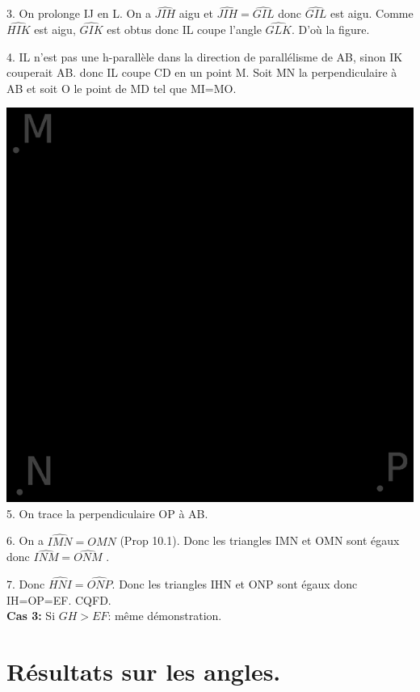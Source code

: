 \documentclass[a4paper, 12pt, twoside]{book}
\begin{document}
  3. On prolonge IJ en L. On a $\hat{JIH}$ aigu et $\hat{JIH}=\hat{GIL}$ donc $\hat{GIL}$ est aigu. Comme $\hat{HIK}$ est aigu, $\hat{GIK}$ est obtus donc IL coupe l'angle $\hat{GLK}$. D'où la figure. \
  
  4. IL n'est pas une h-parallèle dans la direction de parallélisme de AB, sinon IK couperait AB. donc IL coupe CD en un point M. Soit MN la perpendiculaire à AB et soit O le point de MD tel que MI=MO. \
  
   \includegraphics[scale=0.2]{figures/Lobat11.eps}\\
   
   5. On trace la perpendiculaire OP à AB.\
   
   6. On a $\hat{IMN}=\hat{OMN}$ (Prop 10.1). Donc les triangles IMN et OMN sont égaux donc $\hat{INM}=\hat{ONM}$ .\
   
   7. Donc $\hat{HNI}=\hat{ONP}$. Donc les triangles IHN et ONP sont égaux donc IH=OP=EF. CQFD.\\
   
   \textbf{Cas 3:} Si $GH>EF$: même démonstration.\\
   
  \section{Résultats sur les angles.}
      
\end{document}
